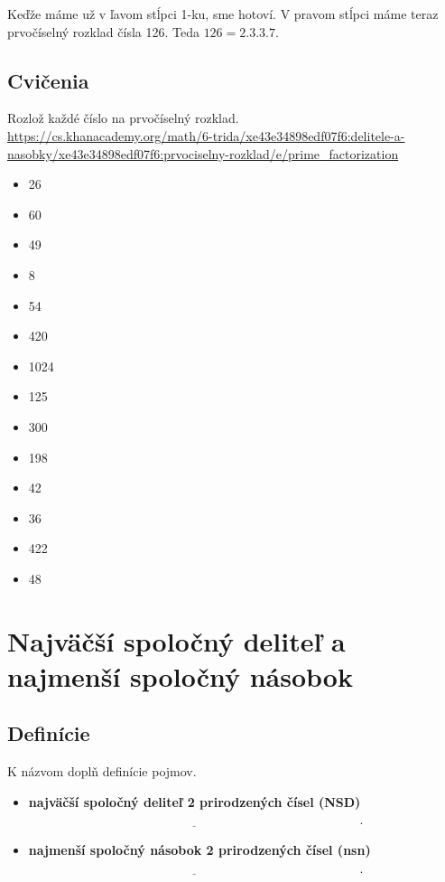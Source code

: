 \documentclass[12pt]{article}
\begin{document}
	Keďže máme už v ľavom stĺpci 1-ku, sme hotoví. V pravom stĺpci máme teraz prvočíselný rozklad čísla 126. Teda $126 = 2.3.3.7$.
	\newline
	
	\subsection{Cvičenia}
	Rozlož každé číslo na prvočíselný rozklad.\\
	\url{https://cs.khanacademy.org/math/6-trida/xe43e34898edf07f6:delitele-a-nasobky/xe43e34898edf07f6:prvociselny-rozklad/e/prime_factorization}
	\begin{itemize}
		\item 26
		\item 60
		\item 49
		\item 8
		\item 54
		\item 420
		\item 1024
		\item 125
		\item 300
		\item 198
		\item 42
		\item 36
		\item 422
		\item 48
	\end{itemize}
	
	\newpage
	\section{Najväčší spoločný deliteľ a najmenší spoločný násobok}
	
	\subsection{Definície}
	K názvom doplň definície pojmov.
	
	\begin{itemize}
		\item \textbf{najväčší spoločný deliteľ 2 prirodzených čísel (NSD)}\\  $\underline{\hspace{11cm}}$.
		\item \textbf{najmenší spoločný násobok 2 prirodzených čísel (nsn)}\\  $\underline{\hspace{11cm}}$.
	\end{itemize}
	
\end{document}
